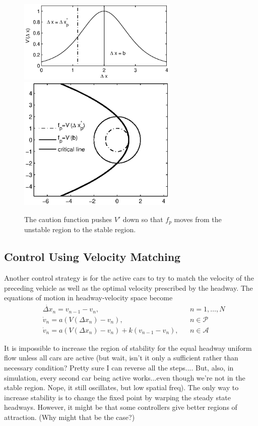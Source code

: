 \documentclass[10pt,twocolumn]{article}
\newcommand{\lm}{\fontfamily{\sfdefault}\selectfont}
\begin{document}
\begin{figure}[!h]
\lm
\begin{center}
\includegraphics[width=3in]{vopt_caution}
\includegraphics[width=3in]{ctrstbl}
\end{center}
\caption{ \label{fig:ctrstbl} The caution function pushes $V'$ down so that $f_p$ moves from the unstable region to the stable region.}
\end{figure}

\subsection{Control Using Velocity Matching}
Another control strategy is for the active cars to try to match the velocity of the preceding vehicle as well as the optimal velocity prescribed by the headway. The equations of motion in headway-velocity space become
\begin{align}
&\dot{\Delta x}_n = v_{n-1} - v_n,& &n=1, \dots, N\\
&\dot{v}_n = a\left(V(\Delta x_n) - v_n \right),& &n \in \mathcal{P}\\
&\dot{v}_n = a\left(V(\Delta x_n) - v_n \right) + k(v_{n-1}-v_n),& &n \in \mathcal{A}
\end{align}

It is impossible to increase the region of stability for the equal headway uniform flow unless all cars are active (but wait, isn't it only a sufficient rather than necessary condition? Pretty sure I can reverse all the steps.... But, also, in simulation, every second car being active works...even though we're not in the stable region. Nope, it still oscillates, but low spatial freq). The only way to increase stability is to change the fixed point by warping the steady state headways. However, it might be that some controllers give better regions of attraction. (Why might that be the case?)
\end{document}
